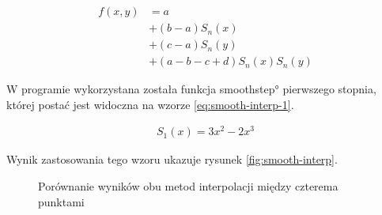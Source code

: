 \begin{equation}
\label{eq:smooth-interp}
  \begin{split}
    f(x, y) & = a \\
       & + (b - a) S_n(x) \\
       & + (c - a) S_n(y) \\
       & + (a - b - c + d) S_n(x) S_n(y)
    \end{split}
\end{equation}

W programie wykorzystana została funkcja \ang{smoothstep} pierwszego stopnia, której postać jest widoczna na wzorze \ref{eq:smooth-interp-1}.

\begin{equation}
\label{eq:smooth-interp-1}
  \begin{split}
    S_1(x) = 3x^2 - 2x^3
  \end{split}
\end{equation}

Wynik zastosowania tego wzoru ukazuje rysunek \ref{fig:smooth-interp}.


\begin{figure}[H]
\centering
{}
\caption{Porównanie wyników obu metod interpolacji między czterema punktami}
\label{fig:interpolacja}
\end{figure}


